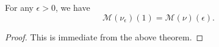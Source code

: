 \begin{corollary}[MellinOfDeltaSpikeAt1]
\label{MellinOfDeltaSpikeAt1}
\leanok
For any $\epsilon>0$, we have
  $$\mathcal{M}(\nu_\epsilon)(1) =
  \mathcal{M}(\nu)(\epsilon).$$
\end{corollary}
\begin{proof}
\leanok
This is immediate from the above theorem.
\end{proof}
